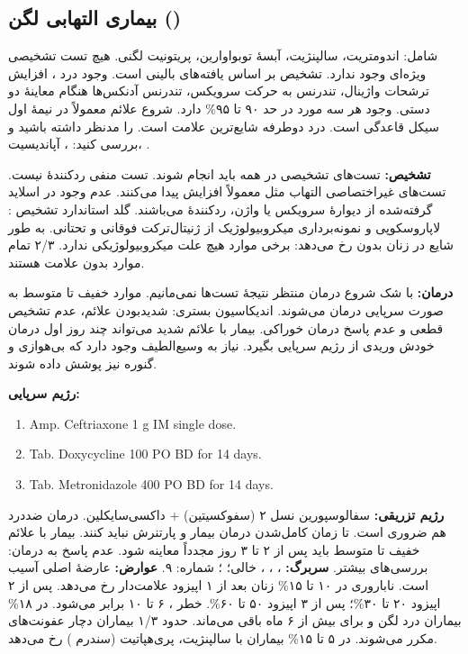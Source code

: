 \documentclass[12pt,a4paper]{article}
\begin{document}
\subsection*{بیماری التهابی لگن ()}
شامل: اندومتریت، سالپنژیت، آبسهٔ توبواوارین، پریتونیت لگنی.
هیچ تست تشخیصی ویژه‌ای وجود ندارد.
تشخیص بر اساس یافته‌های بالینی است.
وجود درد ، افزایش ترشحات واژینال، تندرنس به حرکت سرویکس، تندرنس آدنکس‌ها هنگام معاینهٔ دو دستی.
وجود هر سه مورد  در حد ۹۰ تا ۹۵\% دارد.
شروع علائم معمولاً در نیمهٔ اول سیکل قاعدگی است.
درد  دوطرفه شایع‌ترین علامت است.
 را مدنظر داشته باشید و بررسی کنید: ، آپاندیسیت، .

\textbf{تشخیص:}
تست‌های تشخیصی  در همه باید انجام شوند. تست منفی ردکنندهٔ  نیست.
تست‌های غیراختصاصی التهاب مثل  معمولاً افزایش پیدا می‌کنند.
عدم وجود  در اسلاید گرفته‌شده از دیوارهٔ سرویکس یا واژن، ردکنندهٔ  می‌باشند.
گلد استاندارد تشخیص : لاپاروسکوپی و نمونه‌برداری میکروبیولوژیک از ژنیتال‌ترکت فوقانی و تحتانی.
 به طور شایع در زنان بدون  رخ می‌دهد: برخی موارد هیچ علت میکروبیولوژیکی ندارد.
۲/۳ تمام موارد  بدون علامت هستند.

\textbf{درمان:}
با شک شروع درمان منتظر نتیجهٔ تست‌ها نمی‌مانیم.
موارد خفیف تا متوسط به صورت سرپایی درمان می‌شوند.
اندیکاسیون بستری: شدیدبودن علائم، عدم تشخیص قطعی و عدم پاسخ درمان خوراکی.
بیمار با علائم شدید می‌تواند چند روز اول درمان خودش وریدی از رژیم سرپایی بگیرد.
نیاز به  وسیع‌الطیف وجود دارد که بی‌هوازی و گنوره نیز پوشش داده شوند.

\textbf{رژیم سرپایی:}
\begin{latin}\begin{enumerate}
\item Amp. Ceftriaxone 1 g IM single dose.
\item Tab. Doxycycline 100 PO BD for 14 days.
\item Tab. Metronidazole 400 PO BD for 14 days.
\end{enumerate}\end{latin}
\textbf{رژیم تزریقی:} سفالوسپورین نسل ۲ (سفوکسیتین) + داکسی‌سایکلین.
درمان ضددرد هم ضروری است.
تا زمان کامل‌شدن درمان بیمار و پارتنرش نباید  کنند.
بیمار با علائم خفیف تا متوسط باید پس از ۲ تا ۳ روز مجدداً معاینه شود.
عدم پاسخ به درمان: بررسی‌های بیشتر.
\textbf{سربرگ:} ، ، ،  خالی؛ ؛ شماره: ۹.
\textbf{عوارض:} عارضهٔ اصلی آسیب  است.
ناباروری  در ۱۰ تا ۱۵\% زنان بعد از ۱ اپیزود  علامت‌دار رخ می‌دهد.
پس از ۲ اپیزود ۲۰ تا ۳۰\%؛ پس از ۳ اپیزود ۵۰ تا ۶۰\%.
خطر ، ۶ تا ۱۰ برابر می‌شود.
در ۱۸\% بیماران درد لگن و  برای بیش از ۶ ماه باقی می‌ماند.
حدود ۱/۳ بیماران دچار عفونت‌های مکرر می‌شوند.
در ۵ تا ۱۵\% بیماران با سالپنژیت، پری‌هپاتیت (سندرم ) رخ می‌دهد.
\end{document}
